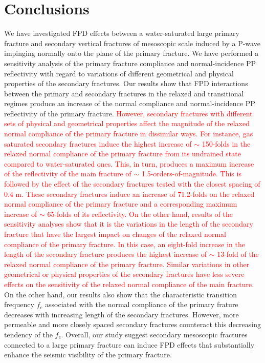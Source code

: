 \documentclass[draft]{agujournal2019}
\newcommand{\red}{\textcolor{red}}
\begin{document}
\section{Conclusions}
We have investigated FPD effects between a water-saturated large primary fracture and secondary vertical fractures of mesoscopic scale induced by a P-wave  impinging normally onto the plane of the primary fracture. We have performed a sensitivity analysis of the primary fracture compliance and normal-incidence PP reflectivity with regard to variations of different geometrical and physical properties of the secondary fractures. Our results show that FPD interactions between the primary and secondary fractures in the relaxed and transitional regimes produce an increase of the normal compliance and normal-incidence PP reflectivity of the primary fracture. 
\red{
However, secondary fractures with different sets of physical and geometrical properties affect the magnitude of the relaxed normal compliance of the primary fracture in dissimilar ways.
For instance, gas saturated secondary fractures induce the highest increase of $\sim$  150-folds in the relaxed normal compliance of the primary fracture from its undrained state compared to water-saturated ones. This, in turn, produces a maximum increase of the reflectivity of the main fracture of $\sim$ 1.5-orders-of-magnitude.
This is followed by the effect of the secondary fractures tested with the closest spacing of 0.4 m. These secondary fractures induce an increase of 71.2-folds on the relaxed normal compliance of the primary fracture and a corresponding  maximum increase of $\sim$ 65-folds of its reflectivity.
On the other hand, results of the sensitivity analyses show that it is the variations in the length of the secondary fracture that have the largest impact on changes of the relaxed normal compliance of the primary fracture.
In this case, an eight-fold increase in the length of the secondary fracture produces the highest increase of $\sim$ 13-fold of the relaxed normal compliance of the primary fracture. Similar variations in other geometrical or physical properties of the secondary fractures have less severe effects on the sensitivity of the relaxed normal compliance of the main fracture.
}
On the other hand, our results also show that the characteristic transition frequency $f_c$ associated with the normal compliance of the  primary frature decreases with increasing length of the secondary fractures. However, more permeable and  more closely spaced secondary fractures counteract this decreasing tendency of the  $f_c$.  
Overall, our study suggest secondary mesoscopic fractures connected to a large primary fracture can induce FPD effects that substantially  enhance the seismic visibility of the primary fracture. 
\end{document}
